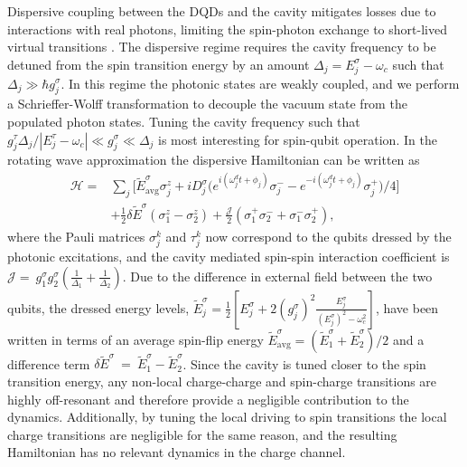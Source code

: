 \documentclass[%
 reprint,
 amsmath,amssymb,
 aps,
prl,
longbibliography
]{revtex4-1}
\begin{document}
Dispersive coupling between the DQDs and the cavity mitigates losses due to interactions with real photons, limiting the spin-photon exchange to short-lived virtual transitions \cite{Harvey-Collard2022, Bonsen2022}. The dispersive regime requires the cavity frequency to be detuned from the spin transition energy by an amount $\Delta_j=E^\sigma_j-\omega_c$ such that $\Delta_j\gg\hbar g^\sigma_j$. In this regime the photonic states are weakly coupled, and we perform a Schrieffer-Wolff transformation to decouple the vacuum state from the populated photon states. Tuning the cavity frequency such that $g_j^\tau\Delta_j/|E_j^\tau-\omega_c|\ll g_j^\sigma\ll\Delta_j$ is most interesting for spin-qubit operation\cite{Benito2019a}. In the rotating wave approximation the dispersive Hamiltonian can be written as
\begin{equation}
\label{eq:TD_effH}
\begin{aligned}
    \mathcal{H} = &\sum_j\bigg[\tilde{E}^\sigma_\text{avg} \sigma^z_j 
    + i D^\sigma_j\bigg(e^{i(\omega_j^d t +\phi_j)}\sigma^-_j-e^{-i(\omega_j^d t +\phi_j)}\sigma^+_j\bigg)/4\bigg]\\
    &+\frac{1}{2}\delta\tilde{E}^\sigma (\sigma^z_1 - \sigma^z_2)
    + \frac{\mathcal{J}}{2} (\sigma^+_1\sigma^-_2+\sigma^-_1\sigma^+_2),
\end{aligned}
\end{equation}
where the Pauli matrices $\sigma^k_j$ and $\tau^k_j$ now correspond to the qubits dressed by the photonic excitations, and the cavity mediated spin-spin interaction coefficient is $\mathcal{J}=~g^\sigma_1 g^\sigma_2(\frac{1}{\Delta_1}+\frac{1}{\Delta_2})$. Due to the difference in external field between the two qubits, the dressed energy levels, $\tilde{E}^\sigma_j = \frac{1}{2}[E^\sigma_j + 2 (g^\sigma_j)^2\frac{E^\sigma_j}{(E^\sigma_j)^2-\omega_c^2}]$, have been written in terms of an average spin-flip energy $\tilde{E}^\sigma_\text{avg} = (\tilde{E}^\sigma_1 + \tilde{E}^\sigma_2)/2$ and a difference term $\delta \tilde{E}^\sigma ~=~ \tilde{E}^\sigma_1 - \tilde{E}^\sigma_2 $. Since the cavity is tuned closer to the spin transition energy, any non-local charge-charge and spin-charge transitions are highly off-resonant and therefore provide a negligible contribution to the dynamics. Additionally, by tuning the local driving to spin transitions the local charge transitions are negligible for the same reason, and the resulting Hamiltonian has no relevant dynamics in the charge channel. 
\end{document}
